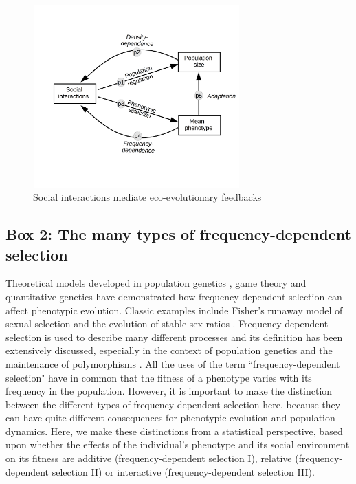 \documentclass{article}
\begin{document}
\begin{figure}[H]
	\renewcommand{\figurename}{Figure B1.}
	\centering
	\includegraphics[width=8cm, height=7cm]{Figures/Fig1.jpg}
	\let\nobreakspace\relax
	\caption{Social interactions mediate eco-evolutionary feedbacks}
\end{figure}


\newpage
\subsection{Box 2: The many types of frequency-dependent selection} 
\setcounter{figure}{0}    
\noindent Theoretical models developed in population genetics \citep{Fisher1930, Wright1969}, game theory \citep{MaynardSmith1982, McGill2007, McNamaraLeimar2020} and quantitative genetics \citep{Lande1976, Lande2007, Engen2020} have demonstrated how frequency-dependent selection can affect phenotypic evolution. Classic examples include Fisher's runaway model of sexual selection and the evolution of stable sex ratios \citep{Fisher1930}. Frequency-dependent selection is used to describe many different processes and its definition has been extensively discussed, especially in the context of population genetics and the maintenance of polymorphisms \citep{Ayala1974, Gromko1977, Heino1998}. All the uses of the term “frequency-dependent selection" have in common that the fitness of a phenotype varies with its frequency in the population. However, it is important to make the distinction between the different types of frequency-dependent selection here, because they can have quite different consequences for phenotypic evolution and population dynamics. Here, we make these distinctions from a statistical perspective, based upon whether the effects of the individual's phenotype and its social environment on its fitness are additive (frequency-dependent selection I), relative (frequency-dependent selection II) or interactive (frequency-dependent selection III).
\end{document}

